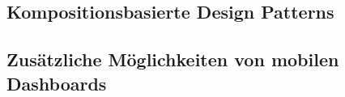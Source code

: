 \subsection{Kompositionsbasierte Design Patterns}\label{subsec:conposition-design-patterns}

\subsection{Zusätzliche Möglichkeiten von mobilen Dashboards}\label{subsec:additional-capabilities-of-mobile-dashboards}

